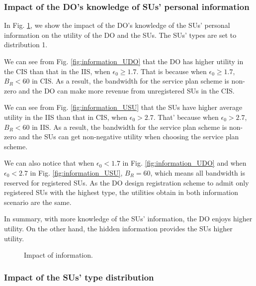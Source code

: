 \documentclass[journal]{IEEEtran}
\begin{document}
\subsubsection{Impact of the DO's knowledge of SUs' personal information}

In Fig. \ref{fig:information}, we show the impact of the DO's knowledge of the SUs' personal information on the utility of the DO and the SUs. The SUs' types are set to distribution 1.

We can see from Fig. \ref{fig:information_UDO} that the DO has higher utility in the CIS than that in the IIS, when $\epsilon_0\geq 1.7$. That is because when $\epsilon_0\geq 1.7$, $B_R<60$ in CIS. As a result, the bandwidth for the service plan scheme is non-zero and the DO can make more revenue from unregistered SUs in the CIS.

We can see from Fig. \ref{fig:information_USU} that the SUs have higher average utility in the IIS than that in CIS, when $\epsilon_0>2.7$. That' because when $\epsilon_0>2.7$, $B_R<60$ in IIS. As a result, the bandwidth for the service plan scheme is non-zero and the SUs can get non-negative utility when choosing the service plan scheme.

We can also notice that when $\epsilon_0<1.7$ in Fig. \ref{fig:information_UDO} and when $\epsilon_0<2.7$ in Fig. \ref{fig:information_USU}, $B_R=60$, which means all bandwidth is reserved for registered SUs. As the DO design registration scheme to admit only registered SUs with the highest type, the utilities obtain in both information scenario are the same.

In summary, with more knowledge of the SUs' information, the DO enjoys higher utility. On the other hand, the hidden information provides the SUs higher utility.

\begin{figure}[t]
\centering
{}\caption{Impact of information.}
\label{fig:information}
\vspace{-0.0cm}
\end{figure}

\subsubsection{Impact of the SUs' type distribution}
\end{document}
